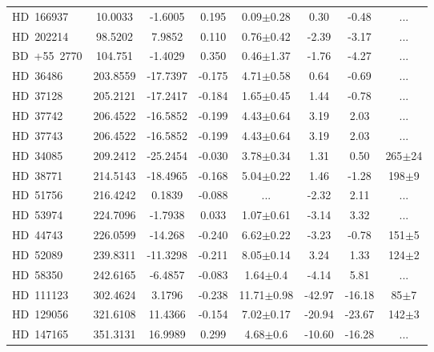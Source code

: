 {\begin{longtable}{lccccccc}
 \noalign{\smallskip}
 \hline
 \endfoot
 \noalign{\smallskip}
HD~166937 & 10.0033 & -1.6005 & 0.195 & 0.09$\pm$0.28 & 0.30 & -0.48 & ... \\
\noalign{\smallskip}
HD~202214 & 98.5202 & 7.9852 & 0.110 & 0.76$\pm$0.42 & -2.39 & -3.17 & ... \\
\noalign{\smallskip}
BD~+55~2770 & 104.751 & -1.4029 & 0.350 & 0.46$\pm$1.37 & -1.76 & -4.27 & ... \\
\noalign{\smallskip}
HD~36486 & 203.8559 & -17.7397 & -0.175 & 4.71$\pm$0.58 & 0.64 & -0.69 & ... \\
\noalign{\smallskip}
HD~37128 & 205.2121 & -17.2417 & -0.184 & 1.65$\pm$0.45 & 1.44 & -0.78 & ... \\
\noalign{\smallskip}
HD~37742 & 206.4522 & -16.5852 & -0.199 & 4.43$\pm$0.64 & 3.19 & 2.03 & ... \\
\noalign{\smallskip}
HD~37743 & 206.4522 & -16.5852 & -0.199 & 4.43$\pm$0.64 & 3.19 & 2.03 & ... \\
\noalign{\smallskip}
HD~34085 & 209.2412 & -25.2454 & -0.030 & 3.78$\pm$0.34 & 1.31 & 0.50 & 265$\pm$24 \\
\noalign{\smallskip}
HD~38771 & 214.5143 & -18.4965 & -0.168 & 5.04$\pm$0.22 & 1.46 & -1.28 & 198$\pm$9 \\
\noalign{\smallskip}
HD~51756 & 216.4242 & 0.1839 & -0.088 & ... & -2.32 & 2.11 & ... \\
\noalign{\smallskip}
HD~53974 & 224.7096 & -1.7938 & 0.033 & 1.07$\pm$0.61 & -3.14 & 3.32 & ... \\
\noalign{\smallskip}
HD~44743 & 226.0599 & -14.268 & -0.240 & 6.62$\pm$0.22 & -3.23 & -0.78 & 151$\pm$5 \\
\noalign{\smallskip}
HD~52089 & 239.8311 & -11.3298 & -0.211 & 8.05$\pm$0.14 & 3.24 & 1.33 & 124$\pm$2 \\
\noalign{\smallskip}
HD~58350 & 242.6165 & -6.4857 & -0.083 & 1.64$\pm$0.4 & -4.14 & 5.81 & ... \\
\noalign{\smallskip}
HD~111123 & 302.4624 & 3.1796 & -0.238 & 11.71$\pm$0.98 & -42.97 & -16.18 & 85$\pm$7 \\
\noalign{\smallskip}
HD~129056 & 321.6108 & 11.4366 & -0.154 & 7.02$\pm$0.17 & -20.94 & -23.67 & 142$\pm$3 \\
\noalign{\smallskip}
HD~147165 & 351.3131 & 16.9989 & 0.299 & 4.68$\pm$0.6 & -10.60 & -16.28 & ... \\
\end{longtable}

}